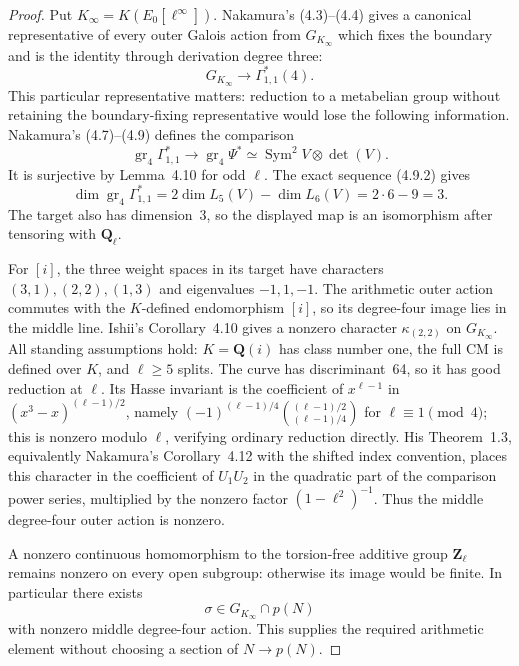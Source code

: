 \begin{proof}
Put $K_\infty=K(E_0[\ell^\infty])$. Nakamura's (4.3)--(4.4) gives\cite[p.~214]{AuditNakamura1995} a canonical representative of every outer Galois action from $G_{K_\infty}$ which fixes the boundary and is the identity through derivation degree three:
\[
 G_{K_\infty}\longrightarrow\Gamma^*_{1,1}(4).
\]
This particular representative matters: reduction to a metabelian group without retaining the boundary-fixing representative would lose the following information. Nakamura's (4.7)--(4.9) defines the comparison
\[
 \operatorname{gr}_4\Gamma^*_{1,1}\longrightarrow
 \operatorname{gr}_4\Psi^*\simeq\operatorname{Sym}^2V\otimes\det(V).
\]
It is surjective by Lemma~4.10 for odd $\ell$\cite[p.~217]{AuditNakamura1995}. The exact sequence (4.9.2) gives
\[
 \dim\operatorname{gr}_4\Gamma^*_{1,1}
 =2\dim L_5(V)-\dim L_6(V)=2\cdot6-9=3.
\]
The target also has dimension~3, so the displayed map is an isomorphism after tensoring with $\mathbf Q_\ell$.

For $[i]$, the three weight spaces in its target have characters $(3,1),(2,2),(1,3)$ and eigenvalues $-1,1,-1$. The arithmetic outer action commutes with the $K$-defined endomorphism $[i]$, so its degree-four image lies in the middle line. Ishii's Corollary~4.10 gives a nonzero character\cite[p.~21]{AuditIshii2024v2} $\kappa_{(2,2)}$ on $G_{K_\infty}$. All standing assumptions hold: $K=\mathbf Q(i)$ has class number one, the full CM is defined over $K$, and $\ell\ge5$ splits. The curve has discriminant~64, so it has good reduction at $\ell$. Its Hasse invariant is the coefficient of $x^{\ell-1}$ in $(x^3-x)^{(\ell-1)/2}$, namely $(-1)^{(\ell-1)/4}\binom{(\ell-1)/2}{(\ell-1)/4}$ for $\ell\equiv1\pmod4$; this is nonzero modulo $\ell$, verifying ordinary reduction directly. His Theorem~1.3, equivalently Nakamura's Corollary~4.12 with the shifted index convention, places this character in the coefficient of $U_1U_2$ in the quadratic part of the comparison power series, multiplied by the nonzero factor $(1-\ell^2)^{-1}$\cite[Theorem~1.3,p.~3]{AuditIshii2024v2}. Thus the middle degree-four outer action is nonzero.

A nonzero continuous homomorphism to the torsion-free additive group $\mathbf Z_\ell$ remains nonzero on every open subgroup: otherwise its image would be finite. In particular there exists
\[
 \sigma\in G_{K_\infty}\cap p(N)
\]
with nonzero middle degree-four action. This supplies the required arithmetic element without choosing a section of $N\to p(N)$.


\end{proof}
